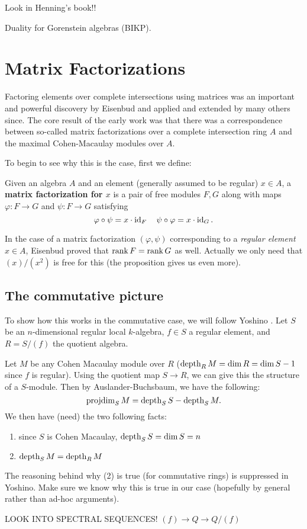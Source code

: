 \documentclass[12pt]{article}
\begin{document}
Look in Henning's book!! 

Duality for Gorenstein algebras (BIKP).

\section{Matrix Factorizations}\label{sec:matrix-factorizations}
Factoring elements over complete intersections using matrices was an important and powerful discovery by Eisenbud \cite{eisenbud80} and applied and extended by many others since. The core result of the early work was that there was a correspondence between so-called matrix factorizations over a complete intersection ring $A$ and the maximal Cohen-Macaulay modules over $A$. 

To begin to see why this is the case, first we define:
\begin{defn}
    Given an algebra $A$ and an element (generally assumed to be regular) $x\in A$, a \textbf{matrix factorization for $x$} is a pair of free modules $F, G$ along with maps $\varphi:F\to G$ and $\psi:F\to G$
    satisfying
    \[\varphi\circ\psi = x\cdot \operatorname{id}_F\quad \psi\circ\varphi=x\cdot \operatorname{id}_G.\]
\end{defn}

\begin{rmk}
    In the case of a matrix factorization $(\varphi,\psi)$ corresponding to a \textit{regular element} $x\in A$, Eisenbud proved \cite[Prop. 5.5]{eisenbud80} that $\operatorname{rank} F=\operatorname{rank} G$ as well. Actually we only need that $(x)/(x^2)$ is free for this (the proposition gives us even more).
\end{rmk} 

\subsection{The commutative picture}

To show how this works in the commutative case, we will follow Yoshino \cite{yoshino90}. Let $S$ be an $n$-dimensional regular local $k$-algebra, $f\in S$ a regular element, and $R=S/(f)$ the quotient algebra.

Let $M$ be any Cohen Macaulay module over $R$ ($\operatorname{depth}_{R} M=\dim R=\dim S - 1$ since $f$ is regular). Using the quotient map $S\to R$, we can give this the structure of a $S$-module. Then by Auslander-Buchsbaum, we have the following:
\[\operatorname{projdim}_{S} M=\operatorname{depth}_{S} S - \operatorname{depth}_{S} M.\]
We then have (need) the two following facts:
\begin{enumerate}
    \item since $S$ is Cohen Macaulay, $\operatorname{depth}_{S} S=\dim S=n$
    \item $\operatorname{depth}_S M=\operatorname{depth}_{R} M$
\end{enumerate}
{\color{red} The reasoning behind why (2) is true (for commutative rings) is suppressed in Yoshino. Make sure we know why this is true in our case (hopefully by general rather than ad-hoc arguments).

LOOK INTO SPECTRAL SEQUENCES! $(f)\to Q\to Q/(f)$}
\end{document}
